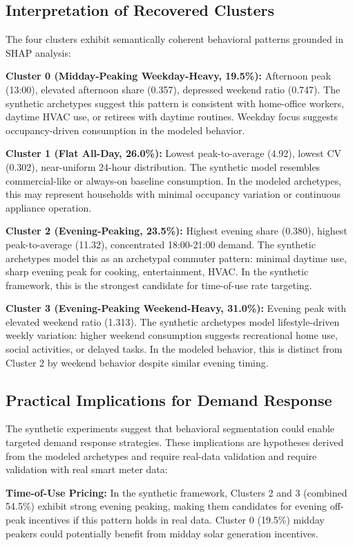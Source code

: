 \documentclass[11pt,a4paper]{article}
\begin{document}
\subsection{Interpretation of Recovered Clusters}

The four clusters exhibit semantically coherent behavioral patterns grounded in SHAP analysis:

\textbf{Cluster 0 (Midday-Peaking Weekday-Heavy, 19.5\%):} Afternoon peak (13:00), elevated afternoon share (0.357), depressed weekend ratio (0.747). The synthetic archetypes suggest this pattern is consistent with home-office workers, daytime HVAC use, or retirees with daytime routines. Weekday focus suggests occupancy-driven consumption in the modeled behavior.

\textbf{Cluster 1 (Flat All-Day, 26.0\%):} Lowest peak-to-average (4.92), lowest CV (0.302), near-uniform 24-hour distribution. The synthetic model resembles commercial-like or always-on baseline consumption. In the modeled archetypes, this may represent households with minimal occupancy variation or continuous appliance operation.

\textbf{Cluster 2 (Evening-Peaking, 23.5\%):} Highest evening share (0.380), highest peak-to-average (11.32), concentrated 18:00-21:00 demand. The synthetic archetypes model this as an archetypal commuter pattern: minimal daytime use, sharp evening peak for cooking, entertainment, HVAC. In the synthetic framework, this is the strongest candidate for time-of-use rate targeting.

\textbf{Cluster 3 (Evening-Peaking Weekend-Heavy, 31.0\%):} Evening peak with elevated weekend ratio (1.313). The synthetic archetypes model lifestyle-driven weekly variation: higher weekend consumption suggests recreational home use, social activities, or delayed tasks. In the modeled behavior, this is distinct from Cluster 2 by weekend behavior despite similar evening timing.

\subsection{Practical Implications for Demand Response}

The synthetic experiments suggest that behavioral segmentation could enable targeted demand response strategies. These implications are hypotheses derived from the modeled archetypes and require real-data validation and require validation with real smart meter data:

\textbf{Time-of-Use Pricing:} In the synthetic framework, Clusters 2 and 3 (combined 54.5\%) exhibit strong evening peaking, making them candidates for evening off-peak incentives if this pattern holds in real data. Cluster 0 (19.5\%) midday peakers could potentially benefit from midday solar generation incentives.
\end{document}
